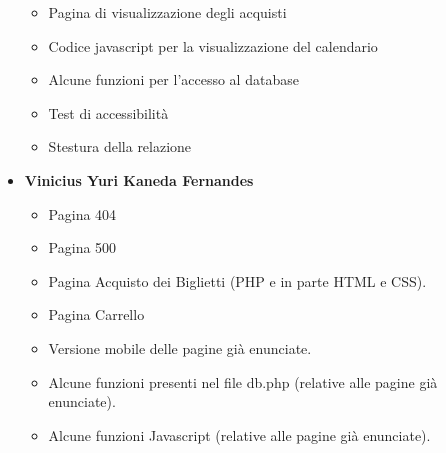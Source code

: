\begin{itemize}
\begin{itemize}
            \item Pagina di visualizzazione degli acquisti
            \item Codice javascript per la visualizzazione del calendario
            \item Alcune funzioni per l'accesso al database
            \item Test di accessibilità
            \item Stestura della relazione
        \end{itemize}
    \item \textbf{Vinicius Yuri Kaneda Fernandes}
        \begin{itemize}
            \item Pagina 404 
            \item Pagina 500 
            \item Pagina Acquisto dei Biglietti (PHP e in parte HTML e CSS).
            \item Pagina Carrello 
            \item Versione mobile delle pagine già enunciate.
            \item Alcune funzioni presenti nel file db.php (relative alle pagine già enunciate).
            \item Alcune funzioni Javascript (relative alle pagine già enunciate).
        \end{itemize}
\end{itemize}